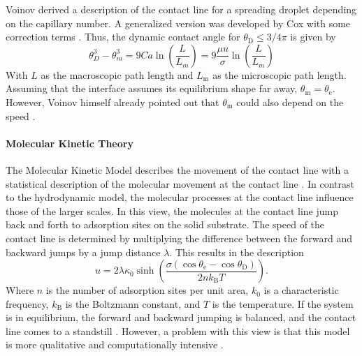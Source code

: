 Voinov \cite{voinovHydrodynamicsWetting1977} derived a description of the contact line for a spreading droplet depending on the capillary number. A generalized version was developed by Cox \cite{cox1986DynamicsSpreadingLiquids} with some correction terms \cite{carlsonCapillarityDynamicWetting2012,blake2006PhysicsMovingWetting}. Thus, the dynamic contact angle for $\theta_{\mathrm{D}} \leq 3/4 \pi$ is given by
\begin{equation}
    \label{eq: Cox-Voinov}
    \theta_D^3-\theta_m^3= 9 Ca \ln\left(\frac{L}{L_m}\right) = 9 \frac{\mu u}{\sigma}\ln\left(\frac{L}{L_m}\right)
\end{equation}
With $L$ as the macroscopic path length and $L_{\mathrm{m}}$ as the microscopic path length. Assuming that the interface assumes its equilibrium shape far away, $\theta_{\mathrm{m}} = \theta_{\mathrm{e}}$. However, Voinov himself already pointed out that $\theta_{\mathrm{m}}$ could also depend on the speed \cite{voinovHydrodynamicsWetting1977,blake2006PhysicsMovingWetting}.



\paragraph{Molecular Kinetic Theory}
The Molecular Kinetic Model describes the movement of the contact line with a statistical description of the molecular movement at the contact line \cite{blake1969KineticsDisplacement}. 
In contrast to the hydrodynamic model, the molecular processes at the contact line influence those of the larger scales. In this view, the molecules at the contact line jump back and forth to adsorption sites on the solid substrate. The speed of the contact line is determined by multiplying the difference between the forward and backward jumps by a jump distance $\lambda$. This results in the description
\begin{equation}
    u=2\lambda\kappa_{0}\sinh\left(\frac{\sigma\left(\cos\theta_{\mathrm{e}}-\cos\theta_{\mathrm{D}}\right)}{2nk_{\mathrm{B}}T}\right).
\end{equation}
Where $n$ is the number of adsorption sites per unit area, $k_0$ is a characteristic frequency, $k_{\mathrm{B}}$ is the Boltzmann constant, and $T$ is the temperature.
If the system is in equilibrium, the forward and backward jumping is balanced, and the contact line comes to a standstill \cite{carlson2011DissipationRapidDynamic,blake2006PhysicsMovingWetting}. However, a problem with this view is that this model is more qualitative and computationally intensive \cite{mohammadkarim2022ReviewPhysicsMoving}.








